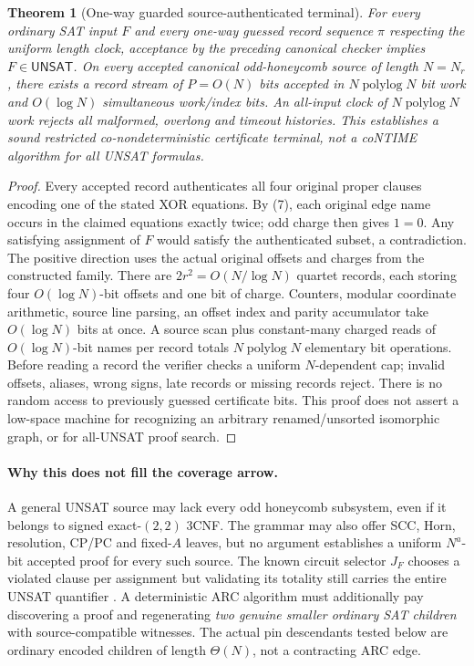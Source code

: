 \documentclass[11pt]{article}
\newtheorem{theorem}{Theorem}
\newcommand{\UNSAT}{\mathsf{UNSAT}}
\begin{document}
\begin{theorem}[One-way guarded source-authenticated terminal]\label{th:stream}
For every ordinary SAT input $F$ and every one-way guessed record sequence $\pi$ respecting the uniform length clock, acceptance by the preceding canonical checker implies $F\in\UNSAT$.  On every accepted \emph{canonical odd-honeycomb} source of length $N=N_r$, there exists a record stream of $P=O(N)$ bits accepted in $N\operatorname{polylog}N$ bit work and $O(\log N)$ simultaneous work/index bits.  An all-input clock of $N\operatorname{polylog}N$ work rejects all malformed, overlong and timeout histories.  This establishes a sound restricted co-nondeterministic \emph{certificate terminal}, not a coNTIME algorithm for all UNSAT formulas.
\end{theorem}
\begin{proof}
Every accepted record authenticates all four original proper clauses encoding one of the stated XOR equations.  By (7), each original edge name occurs in the claimed equations exactly twice; odd charge then gives $1=0$.  Any satisfying assignment of $F$ would satisfy the authenticated subset, a contradiction.  The positive direction uses the actual original offsets and charges from the constructed family.  There are $2r^2=O(N/\log N)$ quartet records, each storing four $O(\log N)$-bit offsets and one bit of charge.  Counters, modular coordinate arithmetic, source line parsing, an offset index and parity accumulator take $O(\log N)$ bits at once.  A source scan plus constant-many charged reads of $O(\log N)$-bit names per record totals $N\operatorname{polylog}N$ elementary bit operations.  Before reading a record the verifier checks a uniform $N$-dependent cap; invalid offsets, aliases, wrong signs, late records or missing records reject.  There is no random access to previously guessed certificate bits.  This proof does not assert a low-space machine for recognizing an arbitrary renamed/unsorted isomorphic graph, or for all-UNSAT proof search.
\end{proof}

\paragraph{Why this does not fill the coverage arrow.} A general UNSAT source may lack every odd honeycomb subsystem, even if it belongs to signed exact-$(2,2)$ 3CNF.  The grammar may also offer SCC, Horn, resolution, CP/PC and fixed-$A$ leaves, but no argument establishes a uniform $N^a$-bit accepted proof for every such source.  The known circuit selector $J_F$ chooses a violated clause per assignment but validating its totality still carries the entire UNSAT quantifier \cite{vanmelkebeek}.  A deterministic ARC algorithm must additionally pay discovering a proof and regenerating \emph{two genuine smaller ordinary SAT children} with source-compatible witnesses.  The actual pin descendants tested below are ordinary encoded children of length $\Theta(N)$, not a contracting ARC edge.
\end{document}

